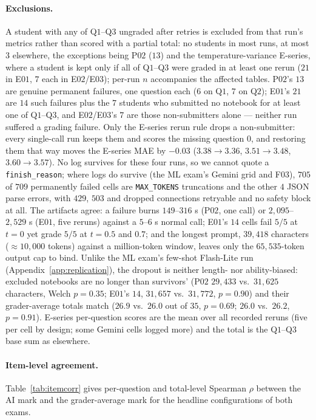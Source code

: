 \paragraph{Exclusions.}
A student with any of Q$1$--Q$3$ ungraded after retries is excluded from that run's metrics rather than scored with a partial total: no students in most runs, at most $3$ elsewhere, the exceptions being P$02$ ($13$) and the temperature-variance E-series, where a student is kept only if all of Q$1$--Q$3$ were graded in at least one rerun ($21$ in E$01$, $7$ each in E$02$/E$03$); per-run $n$ accompanies the affected tables. P$02$'s $13$ are genuine permanent failures, one question each ($6$ on Q$1$, $7$ on Q$2$); E$01$'s $21$ are $14$ such failures plus the $7$ students who submitted no notebook for at least one of Q$1$--Q$3$, and E$02$/E$03$'s $7$ are those non-submitters alone --- neither run suffered a grading failure. Only the E-series rerun rule drops a non-submitter: every single-call run keeps them and scores the missing question $0$, and restoring them that way moves the E-series MAE by $-0.03$ ($3.38 \to 3.36$, $3.51 \to 3.48$, $3.60 \to 3.57$). No log survives for these four runs, so we cannot quote a \texttt{finish\_reason}; where logs do survive (the ML exam's Gemini grid and F$03$), $705$ of $709$ permanently failed cells are \texttt{MAX\_TOKENS} truncations and the other $4$ JSON parse errors, with $429$, $503$ and dropped connections retryable and no safety block at all. The artifacts agree: a failure burns $149$--$316$ s (P$02$, one call) or $2{,}095$--$2{,}529$ s (E$01$, five reruns) against a $5$--$6$ s normal call; E$01$'s $14$ cells fail $5/5$ at $t = 0$ yet grade $5/5$ at $t = 0.5$ and $0.7$; and the longest prompt, $39{,}418$ characters ($\approx 10{,}000$ tokens) against a million-token window, leaves only the $65{,}535$-token output cap to bind. Unlike the ML exam's few-shot Flash-Lite run (Appendix~\ref{app:replication}), the dropout is neither length- nor ability-biased: excluded notebooks are no longer than survivors' (P$02$ $29{,}433$ vs.\ $31{,}625$ characters, Welch $p = 0.35$; E$01$'s $14$, $31{,}657$ vs.\ $31{,}772$, $p = 0.90$) and their grader-average totals match ($26.9$ vs.\ $26.0$ out of $35$, $p = 0.69$; $26.0$ vs.\ $26.2$, $p = 0.91$). E-series per-question scores are the mean over all recorded reruns (five per cell by design; some Gemini cells logged more) and the total is the Q$1$--Q$3$ base sum as elsewhere.

\paragraph{Item-level agreement.}
Table~\ref{tab:itemcorr} gives per-question and total-level Spearman $\rho$ between the AI mark and the grader-average mark for the headline configurations of both exams.

